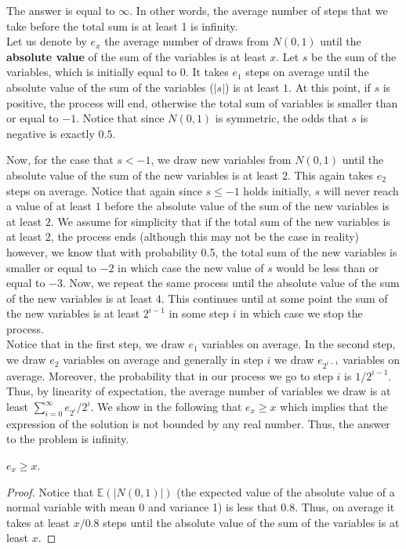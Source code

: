 \begin{solution}
The answer is equal to $\infty$. In other words, the average number of steps that we take before the total sum is at least 1 is infinity.\\[0.2cm]

Let us denote by $e_x$ the average number of draws from $N(0,1)$ until the \textbf{absolute value} of the sum of the variables is at least $x$. Let $s$ be the sum of the variables, which is initially equal to 0. It takes $e_1$ steps on average until the absolute value of the sum of the variables ($|s|$) is at least $1$. At this point, if $s$ is positive, the process will end, otherwise the total sum of variables is smaller than or equal to $-1$. Notice that since $N(0,1)$ is symmetric,  the odds that $s$ is negative is exactly $0.5$.

Now, for the case that $s< -1$, we draw new variables from $N(0,1)$ until the absolute value of the sum of the new variables is at least $2$. This again takes $e_2$ steps on average. Notice that again since $s \leq -1$ holds initially, $s$ will never reach a value of at least $1$ before the absolute value of the sum of the new variables is at least $2$. We assume for simplicity that if the total sum of the new variables is at least $2$, the process ends (although this may not be the case in reality) however, we know that with probability 0.5, the total sum of the new variables is smaller or equal to $-2 $ in which case the new value of $s$ would be less than or equal to $-3$. Now, we repeat the same process until the absolute value of the sum of the new variables is at least $4$. This continues until at some point the sum of the new variables is at least $2^{i-1}$ in some step $i$ in which case we stop the process.\\[0.2cm]

Notice that in the first step, we draw $e_1$ variables on average. In the second step, we draw $e_2$ variables on average and generally in step $i$ we draw $e_{2^{i-1}}$ variables on average. Moreover, the probability that in our process we go to step $i$ is $1/2^{i-1}$. Thus, by linearity of expectation, the average number of variables we draw is at least $\sum_{i=0}^{\infty} e_{2^i}/2^i$. We show in the following that $e_x \geq x$ which implies that the expression of the solution is not bounded by any real number. Thus, the answer to the problem is infinity.

\begin{lemma}
	$e_x \geq x$.
\end{lemma}
\begin{proof}
	Notice that $\mathbb{E}(|N(0,1)|)$ (the expected value of the absolute value of a normal variable with mean 0 and variance 1) is less that $0.8$. Thus, on average it takes at least $x/0.8$ steps until the absolute value of the sum of the variables is at least $x$.
\end{proof}
\end{solution}